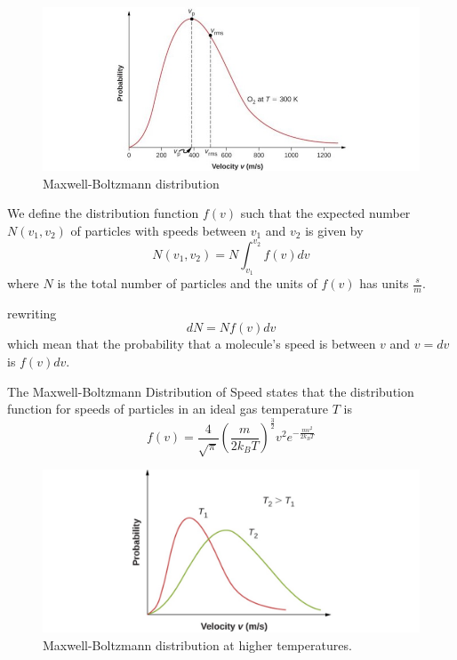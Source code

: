 \documentclass[14pt]{memoir}
\begin{document}
\begin{figure}[H]
\begin{center}
\includegraphics[scale=.6]{fig/fig_02_15.jpg}
\caption{Maxwell-Boltzmann distribution}
\label{fig:02_15}
\end{center}
\end{figure} 

We define the distribution function $f(v)$ such that the expected number $N(v_1,v_2)$ of particles with speeds between $v_1$ and $v_2$ is given by
\begin{equation}
N(v_1,v_2) = N \int_{v_1}^{v_2} f(v) dv
\end{equation}
where $N$ is the total number of particles and the units of $f(v)$  has units $\frac{s}{m}$. 

rewriting 
\begin{equation}
dN = N f(v)dv
\end{equation}
which mean that the probability that a molecule's speed is between $v$ and $v = dv$ is $f(v)dv$.

The Maxwell-Boltzmann Distribution of Speed states that the distribution function for speeds of particles in an ideal gas temperature $T$ is 
\begin{equation}
f(v) = \frac{4}{\sqrt{\pi}}(\frac{m}{2 k_B T})^{\frac{3}{2}} v^2 e^{-\frac{mv^2}{2 k_B T}}
\end{equation}


\begin{figure}[H]
\begin{center}
\includegraphics[scale=.6]{fig/fig_02_16.jpg}
\caption{Maxwell-Boltzmann distribution at higher temperatures.}
\label{fig:02_16}
\end{center}
\end{figure} 
\end{document}
